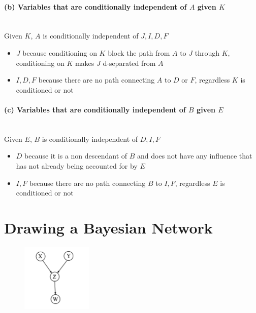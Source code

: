 \documentclass[12pt,letterpaper]{article}
\begin{document}
\paragraph{(b) Variables that are conditionally independent of $A$ given $K$}  \mbox{}\\

Given $K$, $A$ is conditionally independent of $J, I, D, F$

\begin{itemize}
    \item $J$ because conditioning on $K$ block the path from $A$ to $J$ through $K$, conditioning on $K$ makes $J$ d-separated from $A$
    \item $I, D, F$ because there are no path connecting $A$ to $D$ or $F$, regardless $K$ is conditioned or not
\end{itemize}

\paragraph{(c) Variables that are conditionally independent of $B$ given $E$}  \mbox{}\\

Given $E$, $B$ is conditionally independent of $D, I, F$

\begin{itemize}
    \item $D$ because it is a non descendant of $B$ and does not have any influence that has not already being accounted for by $E$
    \item $I, F$ because there are no path connecting $B$ to $I, F$, regardless $E$ is conditioned or not
\end{itemize}


\section*{Drawing a Bayesian Network}

\begin{figure}[h]
    \centering
    \includegraphics[width=0.3\textwidth]{my_network}
\end{figure}
\end{document}
